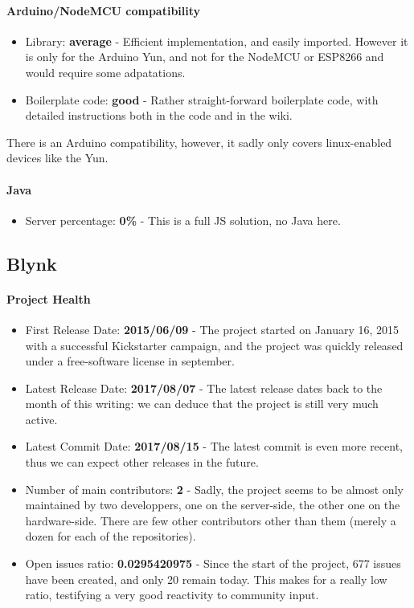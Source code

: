 \documentclass{article}
\begin{document}
\paragraph{Arduino/NodeMCU compatibility}

\begin{itemize}
\item Library: \textbf{average} - Efficient implementation, and easily imported. However it is only for the Arduino Yun, and not for the NodeMCU or ESP8266 and would require some adpatations.
\item Boilerplate code: \textbf{good} - Rather straight-forward boilerplate code, with detailed instructions both in the code and in the wiki.
\end{itemize}

There is an Arduino compatibility, however, it sadly only covers linux-enabled devices like the Yun.

\paragraph{Java} 

\begin{itemize}
\item Server percentage: \textbf{0\%} - This is a full JS solution, no Java here.
\end{itemize}

\subsection{Blynk}

\paragraph{Project Health}

\begin{itemize}
\item First Release Date: \textbf{2015/06/09} - The project started on January 16, 2015 with a successful Kickstarter campaign, and the project was quickly released under a free-software license in september.
\item Latest Release Date: \textbf{2017/08/07} - The latest release dates back to the month of this writing: we can deduce that the project is still very much active.
\item Latest Commit Date: \textbf{2017/08/15} - The latest commit is even more recent, thus we can expect other releases in the future.
\item Number of main contributors: \textbf{2} - Sadly, the project seems to be almost only maintained by two developpers, one on the server-side, the other one on the hardware-side. There are few other contributors other than them (merely a dozen for each of the repositories).
\item Open issues ratio: \textbf{0.0295420975} - Since the start of the project, 677 issues have been created, and only 20 remain today. This makes for a really low ratio, testifying a very good reactivity to community input.
\end{itemize}
\end{document}
